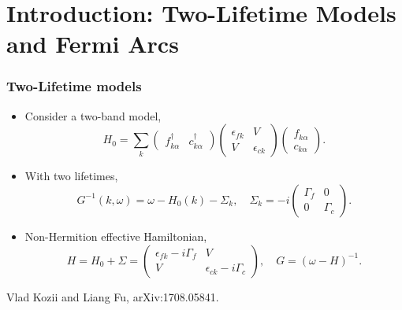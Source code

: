 \documentclass[xcolor=table, 10pt, aspectratio=169]{beamer}
\begin{document}
\section{Introduction: Two-Lifetime Models and Fermi Arcs}


\begin{frame}
\frametitle{Two-Lifetime models}
\begin{itemize}
\item Consider a two-band model,
\[H_0=\sum_k\begin{pmatrix}f_{k\alpha}^\dagger&c_{k\alpha}^\dagger\end{pmatrix}
\begin{pmatrix}\epsilon_{fk} & V\\ V & \epsilon_{ck}\end{pmatrix}
\begin{pmatrix}f_{k\alpha}\\c_{k\alpha}\end{pmatrix}.\]
\item With two lifetimes,
\[G^{-1}(k,\omega)=\omega-H_0(k)-\Sigma_k,\quad
\Sigma_k=-i\begin{pmatrix}\Gamma_f & 0\\0 & \Gamma_c\end{pmatrix}.\]
\item Non-Hermition effective Hamiltonian,
\[H = H_0+\Sigma = \begin{pmatrix}
\epsilon_{fk} - i\Gamma_f & V\\ V & \epsilon_{ck} - i\Gamma_c
\end{pmatrix}, \quad G=(\omega-H)^{-1}.\]
\end{itemize}
Vlad Kozii and Liang Fu, arXiv:1708.05841.
\end{frame}
\end{document}
